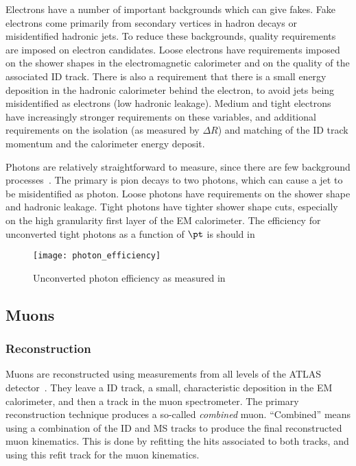 Electrons have a number of important backgrounds which can give fakes.
Fake electrons come primarily from secondary vertices in hadron decays or misidentified hadronic jets.
To reduce these backgrounds, quality requirements are imposed on electron candidates.
Loose electrons have requirements imposed on the shower shapes in the electromagnetic calorimeter and on the quality of the associated ID track.
There is also a requirement that there is a small energy deposition in the hadronic calorimeter behind the electron, to avoid jets being misidentified as electrons (low hadronic leakage).
Medium and tight electrons have increasingly stronger requirements on these variables, and additional requirements on the isolation (as measured by $\Delta R$) and matching of the ID track momentum and the calorimeter energy deposit.

Photons are relatively straightforward to measure, since there are few background processes~\cite{ATL-PHYS-PUB-2016-015}.
The primary is pion decays to two photons, which can cause a jet to be misidentified as photon.
Loose photons have requirements on the shower shape and hadronic leakage.
Tight photons have tighter shower shape cuts, especially on the high granularity first layer of the EM calorimeter.
The efficiency for unconverted tight photons as a function of $\pt$ is should in
\begin{figure}
\caption{Unconverted photon efficiency as measured in ~\cite{ATL-PHYS-PUB-2016-015}} \label{fig:photon_eff}
\texttt{[image: photon\_efficiency]}
\end{figure}

\subsection{Muons}

\subsubsection{Reconstruction}

Muons are reconstructed using measurements from all levels of the ATLAS detector~\cite{PERF-2015-10}.
They leave a ID track, a small, characteristic deposition in the EM calorimeter, and then a track in the muon spectrometer.
The primary reconstruction technique produces a so-called \textit{combined} muon.
``Combined'' means using a combination of the ID and MS tracks to produce the final reconstructed muon kinematics.
This is done by refitting the hits associated to both tracks, and using this refit track for the muon kinematics.

